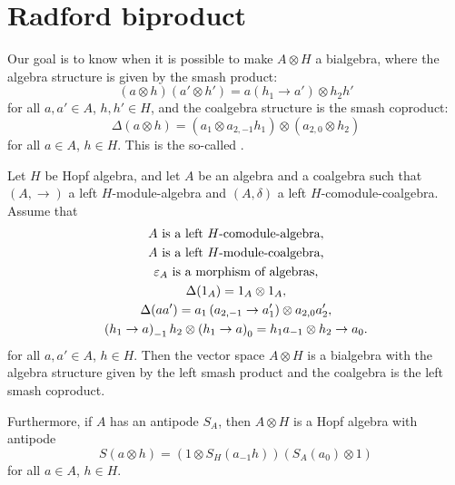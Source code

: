 \section{Radford biproduct}

Our goal is to know when it is possible to make $A\otimes H$ a bialgebra, where
the algebra structure is given by the smash product:
\[
(a\otimes h)(a'\otimes h')=a(h_{1}\to a')\otimes h_{2}h'
\]
for all $a,a'\in A$, $h,h'\in H$, and the coalgebra structure is
the smash coproduct:
\[
\Delta(a\otimes h)=(a_{1}\otimes a_{2,-1}h_{1})\otimes(a_{2,0}\otimes h_{2})
\]
for all $a\in A$, $h\in H$. This is the so-called .

\begin{theorem}
\label{theorem:radford}
Let $H$ be Hopf algebra, and let $A$ be an algebra and a coalgebra such that
$(A,\rightarrow)$ a left $H$-module-algebra and $(A,\delta)$ a left
$H$-comodule-coalgebra.  Assume that 
\begin{gather}
A\text{ is a left \ensuremath{H}-comodule-algebra},\label{eq:radford_1}\\
A\text{ is a left \ensuremath{H}-module-coalgebra,}\label{eq:radford_2}\\
\varepsilon_{A}\text{ is a morphism of algebras,}\label{eq:radford_3}\\
\Delta(1_{A})=1_{A}\otimes1_{A},\label{eq:radford_4}\\
\Delta(aa')=a_{1}\left(a_{2,-1}\rightarrow a'_{1}\right)\otimes a_{2,0}a'_{2},\label{eq:radford_5}\\
\left(h_{1}\rightarrow a\right)_{-1}h_{2}\otimes\left(h_{1}\rightarrow a\right)_{0}=h_{1}a_{-1}\otimes h_{2}\rightarrow a_{0}.\label{eq:radford_6}
\end{gather}
for all $a,a'\in A$, $h\in H$.
Then the vector space $A\otimes H$ is a bialgebra with the algebra structure
given by the left smash product and the coalgebra is the left smash coproduct.

Furthermore, if $A$ has an antipode $S_A$, then $A\otimes H$ is a Hopf algebra
with antipode
\[
S(a\otimes h)=(1\otimes S_{H}(a_{-1}h))(S_{A}(a_{0})\otimes1)
\]
for all $a\in A$, $h\in H$.
\end{theorem}

